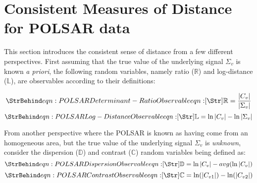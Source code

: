 \section{Consistent Measures of Distance for POLSAR data}
\label{sec:consistent_measures_distance_polsar}

This section introduces the consistent sense of distance from a few different perspectives.
First assuming that the true value of the underlying signal $\Sigma_v$ is known \textit{a priori},
the following random variables,
  namely ratio ($\mathbb{R}$) and log-distance ($\mathbb{L}$),
  are observables according to their definitions:

\begin{equation}
 \label{eqn:determinant_ratio_observables}
 \caption{eqn:POLSAR Determinant-Ratio Observable}
 \mathbb{R} = \frac{|C_v|}{|\Sigma_v|}
\end{equation}
\begin{equation}
 \label{eqn:log_distance_observables}
 \caption{eqn:POLSAR Log-Distance Observable}
 \mathbb{L} = \ln|C_v| - \ln|\Sigma_v|  
\end{equation}

From another perspective where the POLSAR is known as having come from an homogeneous area, but the true value of the underlying signal $\Sigma_v$ is \textit{unknown}, consider the dispersion ($\mathbb{D}$) and contrast ($\mathbb{C}$) random variables being defined as:
\begin{equation}
 \label{eqn:dispersion_observable}
 \caption{eqn:POLSAR Dispersion Observable}
 \mathbb{D} = \ln{|C_v|} - avg(\ln{|C_v|})  
\end{equation}
\begin{equation}
  \label{eqn:contrast_observable}
  \caption{eqn:POLSAR Contrast Observable}
  \mathbb{C} = \ln(|C_{v1}|) - \ln(|C_{v2}|)
\end{equation}

